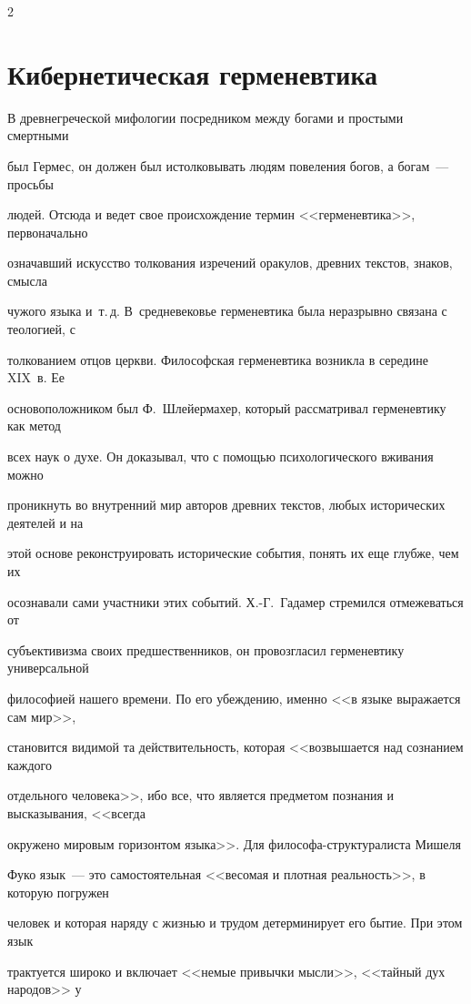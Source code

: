 \begin{multicols}{2}
\section{Кибернетическая герменевтика}





      В древнегреческой мифологии посредником между богами и простыми смертными 


был Гермес, он должен был истолковывать людям повеления богов, а богам~--- просьбы 


людей. Отсюда и ведет свое происхождение термин <<герменевтика>>, первоначально 


означавший искусство толкования изречений оракулов, древних текстов, знаков, смысла 


чужого языка и~т.\,д. В~средневековье герменевтика была неразрывно связана с теологией, с 


толкованием отцов церкви. Философская герменевтика возникла в середине XIX~в. Ее 


основоположником был Ф.~Шлейермахер, который рассматривал герменевтику как метод 


всех наук о духе. Он доказывал, что с помощью психологического вживания можно 


проникнуть во внутренний мир авторов древних текстов, любых исторических деятелей и на 


этой основе реконструировать исторические события, понять их еще глубже, чем их 


осознавали сами участники этих событий. Х.-Г.~Гадамер стремился отмежеваться от 


субъективизма своих предшественников, он провозгласил герменевтику универсальной 


философией нашего времени. По его убеждению, именно <<в языке выражается сам мир>>, 


становится видимой та действительность, которая <<возвышается над сознанием каждого 


отдельного человека>>, ибо все, что является предметом познания и высказывания, <<всегда 


окружено мировым горизонтом языка>>. Для фи\-ло\-со\-фа-струк\-ту\-ра\-ли\-ста Мишеля 


Фуко язык~--- это самостоятельная <<весомая и плотная реальность>>, в которую погружен 


человек и которая наряду с жизнью и трудом детерминирует его бытие. При этом язык 


трактуется широко и включает <<немые привычки мысли>>, <<тайный дух народов>> у 



\end{multicols}
